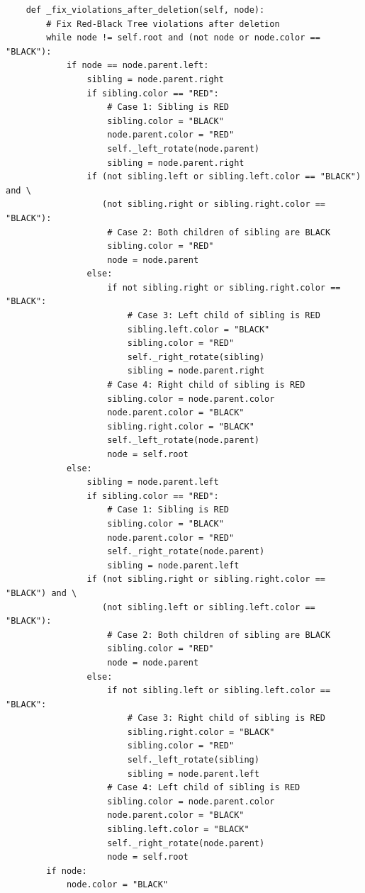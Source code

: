\documentclass[12pt]{book} %
\begin{document}
\begin{lstlisting}
    def _fix_violations_after_deletion(self, node):
        # Fix Red-Black Tree violations after deletion
        while node != self.root and (not node or node.color == "BLACK"):
            if node == node.parent.left:
                sibling = node.parent.right
                if sibling.color == "RED":
                    # Case 1: Sibling is RED
                    sibling.color = "BLACK"
                    node.parent.color = "RED"
                    self._left_rotate(node.parent)
                    sibling = node.parent.right
                if (not sibling.left or sibling.left.color == "BLACK") and \
                   (not sibling.right or sibling.right.color == "BLACK"):
                    # Case 2: Both children of sibling are BLACK
                    sibling.color = "RED"
                    node = node.parent
                else:
                    if not sibling.right or sibling.right.color == "BLACK":
                        # Case 3: Left child of sibling is RED
                        sibling.left.color = "BLACK"
                        sibling.color = "RED"
                        self._right_rotate(sibling)
                        sibling = node.parent.right
                    # Case 4: Right child of sibling is RED
                    sibling.color = node.parent.color
                    node.parent.color = "BLACK"
                    sibling.right.color = "BLACK"
                    self._left_rotate(node.parent)
                    node = self.root
            else:
                sibling = node.parent.left
                if sibling.color == "RED":
                    # Case 1: Sibling is RED
                    sibling.color = "BLACK"
                    node.parent.color = "RED"
                    self._right_rotate(node.parent)
                    sibling = node.parent.left
                if (not sibling.right or sibling.right.color == "BLACK") and \
                   (not sibling.left or sibling.left.color == "BLACK"):
                    # Case 2: Both children of sibling are BLACK
                    sibling.color = "RED"
                    node = node.parent
                else:
                    if not sibling.left or sibling.left.color == "BLACK":
                        # Case 3: Right child of sibling is RED
                        sibling.right.color = "BLACK"
                        sibling.color = "RED"
                        self._left_rotate(sibling)
                        sibling = node.parent.left
                    # Case 4: Left child of sibling is RED
                    sibling.color = node.parent.color
                    node.parent.color = "BLACK"
                    sibling.left.color = "BLACK"
                    self._right_rotate(node.parent)
                    node = self.root
        if node:
            node.color = "BLACK"
\end{lstlisting}
\end{document}
